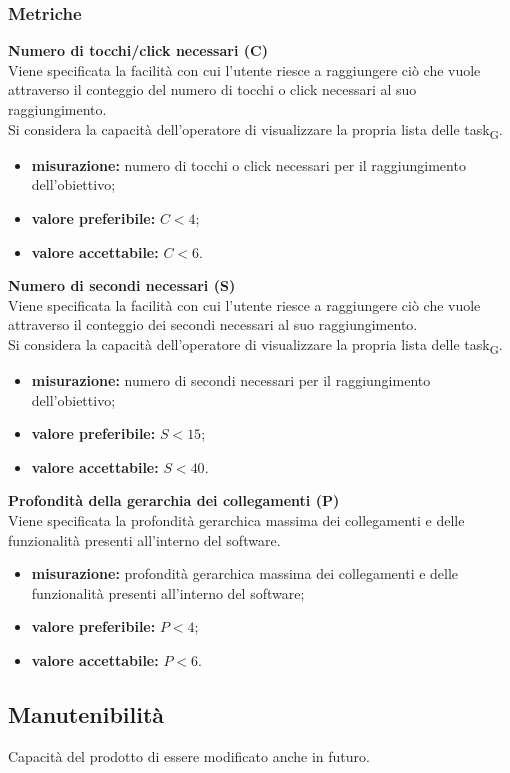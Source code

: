 \subsubsection{Metriche}
\textbf{Numero di tocchi/click necessari (C)}\\
Viene specificata la facilità con cui l'utente riesce a raggiungere ciò che vuole attraverso il conteggio del numero di tocchi o click necessari al suo raggiungimento.\\
Si considera la capacità dell'operatore di visualizzare la propria lista delle \gls{task}\textsubscript{G}.
\begin{itemize}
	\item \textbf{misurazione:} numero di tocchi o click necessari per il raggiungimento dell'obiettivo;
	\item \textbf{valore preferibile:} $C < 4$;
	\item \textbf{valore accettabile:} $C < 6$.
\end{itemize}
\textbf{Numero di secondi necessari (S)}\\
Viene specificata la facilità con cui l'utente riesce a raggiungere ciò che vuole attraverso il conteggio dei secondi necessari al suo raggiungimento.\\
Si considera la capacità dell'operatore di visualizzare la propria lista delle \gls{task}\textsubscript{G}.
\begin{itemize}
	\item \textbf{misurazione:} numero di secondi necessari per il raggiungimento dell'obiettivo;
	\item \textbf{valore preferibile:} $S < 15$;
	\item \textbf{valore accettabile:} $S < 40$.
\end{itemize}
\textbf{Profondità della gerarchia dei collegamenti (P)}\\
Viene specificata la profondità gerarchica massima dei collegamenti e delle funzionalità presenti all'interno del software.
\begin{itemize}
	\item \textbf{misurazione:} profondità gerarchica massima dei collegamenti e delle funzionalità presenti all'interno del software;
	\item \textbf{valore preferibile:} $P < 4$;
	\item \textbf{valore accettabile:} $P < 6$.
\end{itemize}
\subsection{Manutenibilità}
Capacità del prodotto di essere modificato anche in futuro.
